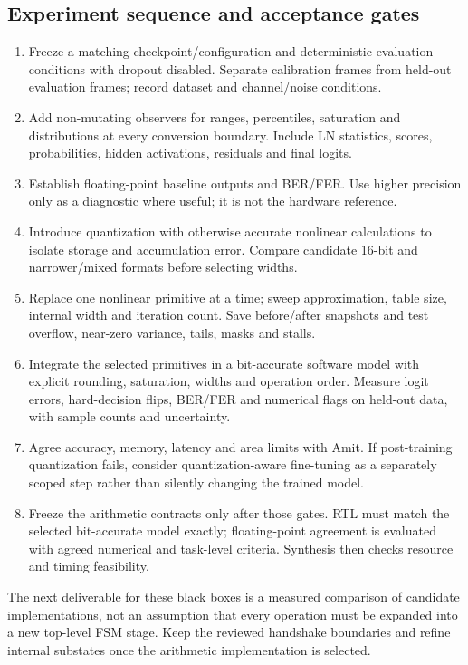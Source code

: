 \documentclass[11pt,a4paper]{article}
\begin{document}
\subsection{Experiment sequence and acceptance gates}
\begin{enumerate}
\item Freeze a matching checkpoint/configuration and deterministic evaluation conditions with dropout disabled. Separate calibration frames from held-out evaluation frames; record dataset and channel/noise conditions.
\item Add non-mutating observers for ranges, percentiles, saturation and distributions at every conversion boundary. Include LN statistics, scores, probabilities, hidden activations, residuals and final logits.
\item Establish floating-point baseline outputs and BER/FER. Use higher precision only as a diagnostic where useful; it is not the hardware reference.
\item Introduce quantization with otherwise accurate nonlinear calculations to isolate storage and accumulation error. Compare candidate 16-bit and narrower/mixed formats before selecting widths.
\item Replace one nonlinear primitive at a time; sweep approximation, table size, internal width and iteration count. Save before/after snapshots and test overflow, near-zero variance, tails, masks and stalls.
\item Integrate the selected primitives in a bit-accurate software model with explicit rounding, saturation, widths and operation order. Measure logit errors, hard-decision flips, BER/FER and numerical flags on held-out data, with sample counts and uncertainty.
\item Agree accuracy, memory, latency and area limits with Amit. If post-training quantization fails, consider quantization-aware fine-tuning as a separately scoped step rather than silently changing the trained model.
\item Freeze the arithmetic contracts only after those gates. RTL must match the selected bit-accurate model exactly; floating-point agreement is evaluated with agreed numerical and task-level criteria. Synthesis then checks resource and timing feasibility.
\end{enumerate}
The next deliverable for these black boxes is a measured comparison of candidate implementations, not an assumption that every operation must be expanded into a new top-level FSM stage. Keep the reviewed handshake boundaries and refine internal substates once the arithmetic implementation is selected.

\end{document}
